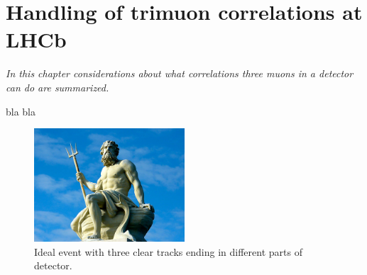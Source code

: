 \chapter{Handling of trimuon correlations at LHCb}
\label{chap:trimuon}

\textit{In this chapter considerations about what correlations three muons in a detector can do are summarized.}

bla bla

\begin{figure}[!h]
        \centering
        \includegraphics[width = 0.5\textwidth]{figs/trimuon/poze.jpg}
        \caption{Ideal event with three clear tracks ending in different parts of detector.}
        \label{fig:sigtopolog}
\end{figure}

